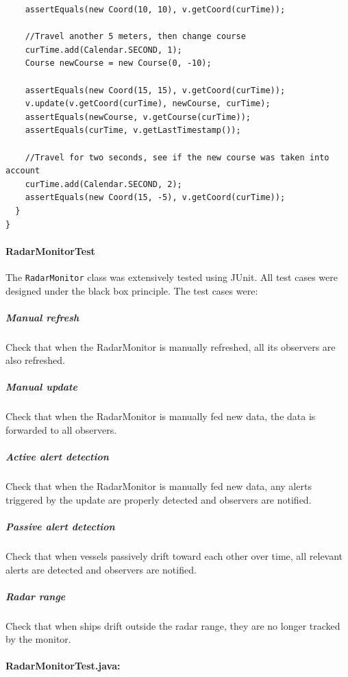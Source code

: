 \documentclass{article}
\begin{document}
\begin{verbatim}
    assertEquals(new Coord(10, 10), v.getCoord(curTime));
    
    //Travel another 5 meters, then change course
    curTime.add(Calendar.SECOND, 1);
    Course newCourse = new Course(0, -10);

    assertEquals(new Coord(15, 15), v.getCoord(curTime));
    v.update(v.getCoord(curTime), newCourse, curTime);
    assertEquals(newCourse, v.getCourse(curTime));
    assertEquals(curTime, v.getLastTimestamp());
    
    //Travel for two seconds, see if the new course was taken into account
    curTime.add(Calendar.SECOND, 2);
    assertEquals(new Coord(15, -5), v.getCoord(curTime));
  }
}

\end{verbatim}
\linespread{1.6}

\paragraph{RadarMonitorTest \\}

The \verb|RadarMonitor| class was extensively tested using JUnit. All test cases were designed under the black box principle. The test cases were:

\subparagraph{Manual refresh \\}
Check that when the RadarMonitor is manually refreshed, all its observers are also refreshed.

\subparagraph{Manual update \\}
Check that when the RadarMonitor is manually fed new data, the data is forwarded to all observers.

\subparagraph{Active alert detection \\}
Check that when the RadarMonitor is manually fed new data, any alerts triggered by the update are properly detected and observers are notified.

\subparagraph{Passive alert detection \\}
Check that when vessels passively drift toward each other over time, all relevant alerts are detected and observers are notified.

\subparagraph{Radar range \\}
Check that when ships drift outside the radar range, they are no longer tracked by the monitor.

\paragraph{RadarMonitorTest.java:}
\end{document}
